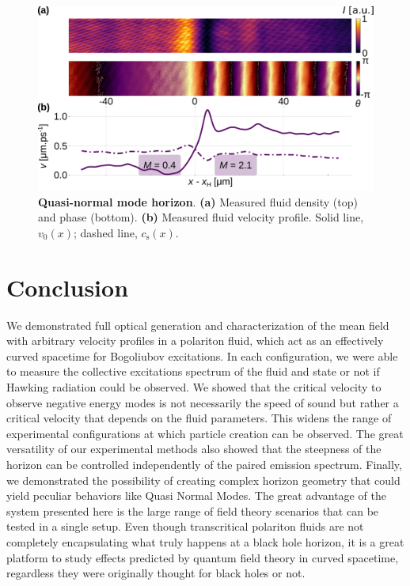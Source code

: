 \begin{figure}[h]
    \centering
    \includegraphics[width=1\textwidth]{chap_custom_st/fig/bh_qnm.pdf}
    \caption{\textbf{Quasi-normal mode horizon}.    
    \textbf{(a)} Measured fluid density (top) and phase (bottom).
    \textbf{(b)} Measured fluid velocity profile.
    Solid line, $v_0(x)$; dashed line, $c_\mathrm{s}(x)$.}
    \label{fig:bh_qnm}
\end{figure}
\clearpage
\section{Conclusion}

We demonstrated full optical generation and characterization of the mean field with arbitrary velocity profiles in a polariton fluid, which act as an effectively curved spacetime for 
Bogoliubov excitations. In each configuration, we were able to measure the collective excitations spectrum of the fluid and state or not if Hawking radiation could be observed. We showed that the critical velocity to observe negative energy modes is not necessarily the speed of sound but rather a critical velocity 
that depends on the fluid parameters. This widens the range of experimental configurations at which particle creation can be observed. The great versatility of our experimental methods also showed that the steepness of the horizon can be controlled independently of the paired emission spectrum.
Finally, we demonstrated the possibility of creating complex horizon geometry that could yield peculiar behaviors like Quasi Normal Modes. The great 
advantage of the system presented here is the large range of field theory scenarios that can be tested in a single setup. Even though
 transcritical polariton fluids are not completely encapsulating what truly happens at a black hole horizon, it is a great platform to study effects predicted by quantum field theory in curved spacetime, regardless they were
originally thought for black holes or not.


